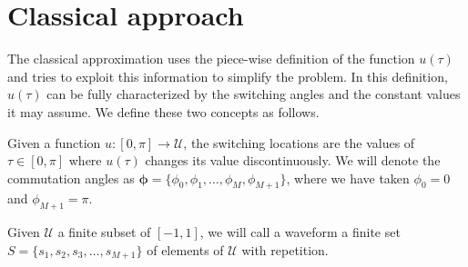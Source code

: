 \section{Classical approach}\label{Section2}

The classical approximation uses the piece-wise definition of the function $u(\tau)$ and tries to exploit this information to simplify the problem.  In this definition, $u(\tau)$ can be fully characterized by the switching angles and the constant values it may assume. We define these two concepts as follows.
\newline

\begin{definition}
Given a function $u:[0,\pi] \rightarrow \mathcal{U}$, the switching locations are the values of $\tau\in[0,\pi]$ where $u(\tau)$ changes its value discontinuously. We will denote the commutation angles as $\bm{\phi} = \{\phi_0,\phi_1,\dots,\phi_M,\phi_{M+1}\}$, where we have taken $\phi_0 = 0$ and $\phi_{M+1} = \pi$.
\end{definition}

\begin{definition}[Waveform]
Given $\mathcal U$ a finite subset of $[-1,1]$, we will call a waveform a finite set $S = \{s_1,s_2,s_3,\dots,s_{M+1}\}$ of elements of $\mathcal {U}$ with repetition.
\end{definition}

